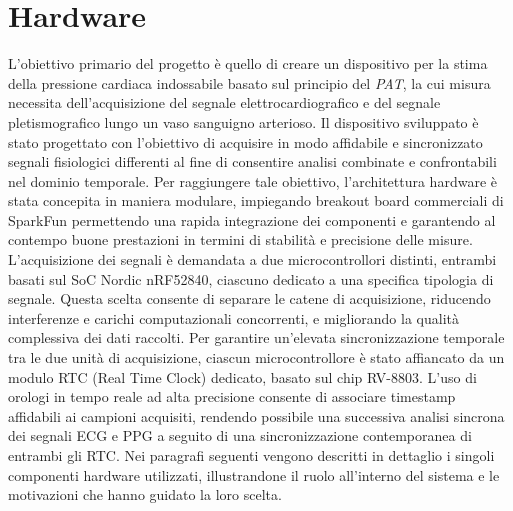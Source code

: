 \documentclass[11pt,a4paper]{article}
\begin{document}
\section{Hardware}
L'obiettivo primario del progetto è quello di creare un dispositivo per la stima della pressione cardiaca indossabile basato sul principio del \textit{PAT}, la cui misura necessita dell'acquisizione del segnale elettrocardiografico e del segnale pletismografico lungo un vaso sanguigno arterioso.
Il dispositivo sviluppato è stato progettato con l’obiettivo di acquisire in modo affidabile e sincronizzato segnali fisiologici differenti al fine di consentire analisi combinate e confrontabili nel dominio temporale. Per raggiungere tale obiettivo, l’architettura hardware è stata concepita in maniera modulare, impiegando breakout board commerciali di SparkFun permettendo una rapida integrazione dei componenti e garantendo al contempo buone prestazioni in termini di stabilità e precisione delle misure.
L’acquisizione dei segnali è demandata a due microcontrollori distinti, entrambi basati sul SoC Nordic nRF52840, ciascuno dedicato a una specifica tipologia di segnale. Questa scelta consente di separare le catene di acquisizione, riducendo interferenze e carichi computazionali concorrenti, e migliorando la qualità complessiva dei dati raccolti.
Per garantire un’elevata sincronizzazione temporale tra le due unità di acquisizione, ciascun microcontrollore è stato affiancato da un modulo RTC (Real Time Clock) dedicato, basato sul chip RV-8803. L’uso di orologi in tempo reale ad alta precisione consente di associare timestamp affidabili ai campioni acquisiti, rendendo possibile una successiva analisi sincrona dei segnali ECG e PPG a seguito di una sincronizzazione contemporanea di entrambi gli RTC.
Nei paragrafi seguenti vengono descritti in dettaglio i singoli componenti hardware utilizzati, illustrandone il ruolo all’interno del sistema e le motivazioni che hanno guidato la loro scelta.
\end{document}
